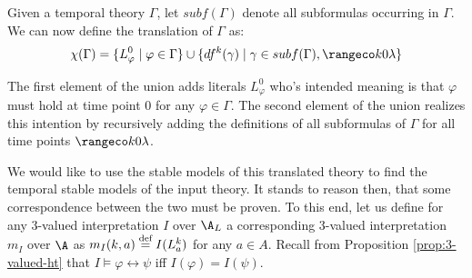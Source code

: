 Given a temporal theory $\Gamma$, let $subf(\Gamma)$ denote all
subformulas occurring in $\Gamma$. We can now define the translation
of $\Gamma$ as:
$$
\chi(\Gamma) = \{ L_\varphi^0 \mid \varphi \in \Gamma \} 
\cup \{ df^k(\gamma) \mid \gamma \in subf(\Gamma), \kinlambda \}
$$

The first element of the union adds literals $L_\varphi^0$ who's
intended meaning is that $\varphi$ must hold at time point $0$ for any
$\varphi \in \Gamma$. The second element of the union realizes this
intention by recursively adding the definitions of all subformulas of
$\Gamma$ for all time points $\kinlambda$.

We would like to use the stable models of this translated theory to
find the temporal stable models of the input theory. It stands to
reason then, that some correspondence between the two must be
proven. To this end, let us define for any 3-valued interpretation $I$
over $\A_L$ a corresponding 3-valued interpretation $m_I$ over $\A$ as
$m_I(k,a) \stackrel{\text{def}}{=} I(L_a^k)$ for any $a \in A$. Recall from Proposition
\ref{prop:3-valued-ht} that $I \models \varphi \leftrightarrow \psi$
iff $I(\varphi) = I(\psi)$.

